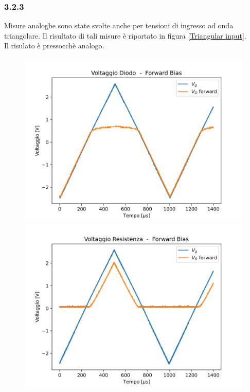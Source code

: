 \subsubsection{3.2.3}
Misure analoghe sono state svolte anche per tensioni di ingresso ad onda triangolare. Il risultato di tali misure è riportato in figura \ref{Triangular input}.\\
Il risulato è pressocchè analogo.
\begin{figure}
    \centering
    \begin{minipage}{0.475\textwidth}
        \includegraphics[width=1\textwidth]{Diodo 3.2.3/Triang_V_D_Forward.png}
    \end{minipage}
    \hfill
    \begin{minipage}{0.475\textwidth}
        \includegraphics[width=1\textwidth]{Diodo 3.2.3/Triang_V_R_Forward.png}

\end{minipage}
\end{figure}
